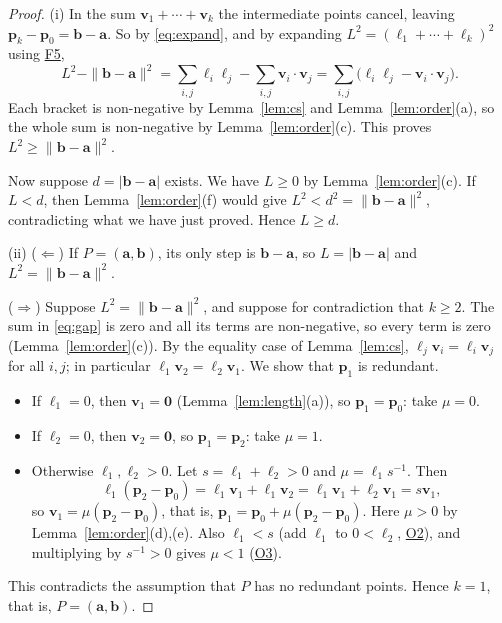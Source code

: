 \documentclass[11pt]{article}
\newcommand{\axF}[1]{\hyperref[ax:F#1]{F#1}}
\newcommand{\axO}[1]{\hyperref[ax:O#1]{O#1}}
\theoremstyle{plain}
\theoremstyle{definition}
\theoremstyle{remark}
\begin{document}
\begin{proof}
(i) In the sum $\mathbf{v}_1 + \cdots + \mathbf{v}_k$ the intermediate points cancel, leaving $\mathbf{p}_k - \mathbf{p}_0 = \mathbf{b} - \mathbf{a}$. So by \eqref{eq:expand}, and by expanding $L^2 = (\ell_1 + \cdots + \ell_k)^2$ using \axF{5},
\begin{equation}\label{eq:gap}
    L^2 - \|\mathbf{b} - \mathbf{a}\|^2
    = \sum_{i,j} \ell_i \ell_j - \sum_{i,j} \mathbf{v}_i \cdot \mathbf{v}_j
    = \sum_{i,j} \bigl(\ell_i \ell_j - \mathbf{v}_i \cdot \mathbf{v}_j\bigr).
\end{equation}
Each bracket is non-negative by Lemma~\ref{lem:cs} and Lemma~\ref{lem:order}(a), so the whole sum is non-negative by Lemma~\ref{lem:order}(c). This proves $L^2 \geq \|\mathbf{b} - \mathbf{a}\|^2$.

Now suppose $d = |\mathbf{b} - \mathbf{a}|$ exists. We have $L \geq 0$ by Lemma~\ref{lem:order}(c). If $L < d$, then Lemma~\ref{lem:order}(f) would give $L^2 < d^2 = \|\mathbf{b} - \mathbf{a}\|^2$, contradicting what we have just proved. Hence $L \geq d$.

(ii) ($\Leftarrow$) If $P = (\mathbf{a}, \mathbf{b})$, its only step is $\mathbf{b} - \mathbf{a}$, so $L = |\mathbf{b} - \mathbf{a}|$ and $L^2 = \|\mathbf{b} - \mathbf{a}\|^2$.

($\Rightarrow$) Suppose $L^2 = \|\mathbf{b} - \mathbf{a}\|^2$, and suppose for contradiction that $k \geq 2$. The sum in \eqref{eq:gap} is zero and all its terms are non-negative, so every term is zero (Lemma~\ref{lem:order}(c)). By the equality case of Lemma~\ref{lem:cs}, $\ell_j \mathbf{v}_i = \ell_i \mathbf{v}_j$ for all $i, j$; in particular $\ell_1 \mathbf{v}_2 = \ell_2 \mathbf{v}_1$. We show that $\mathbf{p}_1$ is redundant.
\begin{itemize}
    \item If $\ell_1 = 0$, then $\mathbf{v}_1 = \mathbf{0}$ (Lemma~\ref{lem:length}(a)), so $\mathbf{p}_1 = \mathbf{p}_0$: take $\mu = 0$.
    \item If $\ell_2 = 0$, then $\mathbf{v}_2 = \mathbf{0}$, so $\mathbf{p}_1 = \mathbf{p}_2$: take $\mu = 1$.
    \item Otherwise $\ell_1, \ell_2 > 0$. Let $s = \ell_1 + \ell_2 > 0$ and $\mu = \ell_1 s^{-1}$. Then
    \begin{equation}
        \ell_1 (\mathbf{p}_2 - \mathbf{p}_0) = \ell_1 \mathbf{v}_1 + \ell_1 \mathbf{v}_2 = \ell_1 \mathbf{v}_1 + \ell_2 \mathbf{v}_1 = s \mathbf{v}_1,
    \end{equation}
    so $\mathbf{v}_1 = \mu (\mathbf{p}_2 - \mathbf{p}_0)$, that is, $\mathbf{p}_1 = \mathbf{p}_0 + \mu (\mathbf{p}_2 - \mathbf{p}_0)$. Here $\mu > 0$ by Lemma~\ref{lem:order}(d),(e). Also $\ell_1 < s$ (add $\ell_1$ to $0 < \ell_2$, \axO{2}), and multiplying by $s^{-1} > 0$ gives $\mu < 1$ (\axO{3}).
\end{itemize}
This contradicts the assumption that $P$ has no redundant points. Hence $k = 1$, that is, $P = (\mathbf{a}, \mathbf{b})$.


\end{proof}
\end{document}

